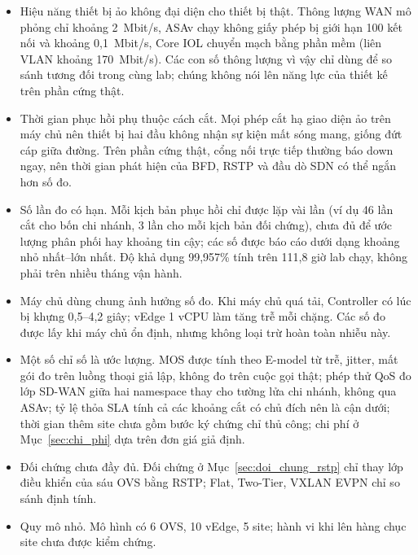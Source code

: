 \begin{itemize}
    \item Hiệu năng thiết bị ảo không đại diện cho thiết bị thật. Thông lượng WAN mô phỏng chỉ khoảng 2~Mbit/s, ASAv chạy không giấy phép bị giới hạn 100 kết nối và khoảng 0,1~Mbit/s, Core IOL chuyển mạch bằng phần mềm (liên VLAN khoảng 170~Mbit/s). Các con số thông lượng vì vậy chỉ dùng để so sánh tương đối trong cùng lab; chúng không nói lên năng lực của thiết kế trên phần cứng thật.
    \item Thời gian phục hồi phụ thuộc cách cắt. Mọi phép cắt hạ giao diện ảo trên máy chủ nên thiết bị hai đầu không nhận sự kiện mất sóng mang, giống đứt cáp giữa đường. Trên phần cứng thật, cổng nối trực tiếp thường báo down ngay, nên thời gian phát hiện của BFD, RSTP và đầu dò SDN có thể ngắn hơn số đo.
    \item Số lần đo có hạn. Mỗi kịch bản phục hồi chỉ được lặp vài lần (ví dụ 46 lần cắt cho bốn chi nhánh, 3 lần cho mỗi kịch bản đối chứng), chưa đủ để ước lượng phân phối hay khoảng tin cậy; các số được báo cáo dưới dạng khoảng nhỏ nhất--lớn nhất. Độ khả dụng 99,957\% tính trên 111,8 giờ lab chạy, không phải trên nhiều tháng vận hành.
    \item Máy chủ dùng chung ảnh hưởng số đo. Khi máy chủ quá tải, Controller có lúc bị khựng 0,5--4,2 giây; vEdge 1 vCPU làm tăng trễ mỗi chặng. Các số đo được lấy khi máy chủ ổn định, nhưng không loại trừ hoàn toàn nhiễu này.
    \item Một số chỉ số là ước lượng. MOS được tính theo E-model từ trễ, jitter, mất gói đo trên luồng thoại giả lập, không đo trên cuộc gọi thật; phép thử QoS đo lớp SD-WAN giữa hai namespace thay cho tường lửa chi nhánh, không qua ASAv; tỷ lệ thỏa SLA tính cả các khoảng cắt có chủ đích nên là cận dưới; thời gian thêm site chưa gồm bước ký chứng chỉ thủ công; chi phí ở Mục~\ref{sec:chi_phi} dựa trên đơn giá giả định.
    \item Đối chứng chưa đầy đủ. Đối chứng ở Mục~\ref{sec:doi_chung_rstp} chỉ thay lớp điều khiển của sáu OVS bằng RSTP; Flat, Two-Tier, VXLAN EVPN chỉ so sánh định tính.
    \item Quy mô nhỏ. Mô hình có 6 OVS, 10 vEdge, 5 site; hành vi khi lên hàng chục site chưa được kiểm chứng.
\end{itemize}
